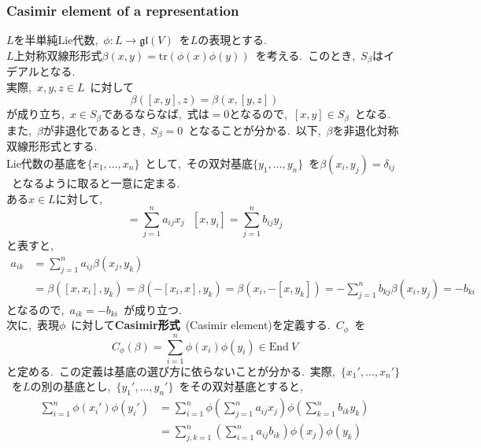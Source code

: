 \documentclass[uplatex,dvipdfmx]{jsarticle}
\begin{document}
\subsubsection{Casimir element of a representation}
$L$を半単純Lie代数,~$\phi: L \to \mathfrak{gl}(V)$~を$L$の表現とする.\\
$L$上対称双線形形式$\beta(x,y) = \text{tr}(\phi(x)\phi(y))$~を考える.~このとき,~$S_\beta$はイデアルとなる.\\
実際,~$x,y,z\in L$~に対して
\begin{equation}
    \beta ([x,y],z) = \beta (x,[y,z])
\end{equation}
が成り立ち,~$x\in S_\beta $であるならなば,~式は$=0$となるので,~$[x,y]\in S_\beta$~となる.\\
また,~$\beta$が非退化であるとき,~$S_\beta = 0$~となることが分かる.~以下,~$\beta$を非退化対称双線形形式とする.\\
Lie代数の基底を$\{x_1 ,\ldots, x_n\}$~として,~その双対基底$\{y_1 ,\ldots, y_n\}$~を$\beta(x_i , y_j ) = \delta_{ij}$~となるように取ると一意に定まる.\\
ある$x \in L $に対して,
\begin{equation*}
    [x,x_i ] = \sum_{j=1}^n a_{ij} x_j~~~ [x,y_i ] = \sum_{j=1}^n b_{ij} y_j
\end{equation*}
と表すと,
\begin{equation*}
    \begin{split}
        a_{ik} &= \sum_{j=1}^n a_{ij} \beta(x_j , y_k ) \\
        &= \beta ([x,x_i ], y_k ) =\beta (-[x_i , x], y_k ) = \beta (x_i ,-[x,y_k ]) =- \sum_{j=1}^n b_{kj} \beta (x_i , y_j )=- b_{ki}
    \end{split}
\end{equation*}
となるので,~$a_{ik} = - b_{ki}$~が成り立つ.\\
次に,~表現$\phi$~に対して\textbf{Casimir形式}~(Casimir element)を定義する.~$C_\phi$~を
\begin{equation*}
    C_\phi(\beta) = \sum_{i=1}^n \phi(x_i )\phi(y_i )\in \text{End}~V
\end{equation*}
と定める.~この定義は基底の選び方に依らないことが分かる.~実際,~$\{x_1' ,\ldots, x_n'\}$~を$L$の別の基底とし,~$\{y_1' ,\ldots, y_n'\}$~をその双対基底とすると,
\begin{equation*}
    \begin{split}
        \sum_{i=1}^n \phi(x_i' )\phi(y_i' ) &= \sum_{i=1}^n \phi\left( \sum_{j=1}^n a_{ij} x_j \right) \phi\left( \sum_{k=1}^n b_{ik} y_k \right)\\
        &= \sum_{j,k=1}^n \left( \sum_{i=1}^n a_{ij} b_{ik} \right) \phi(x_j )\phi(y_k )
    \end{split}
\end{equation*}
\end{document}
